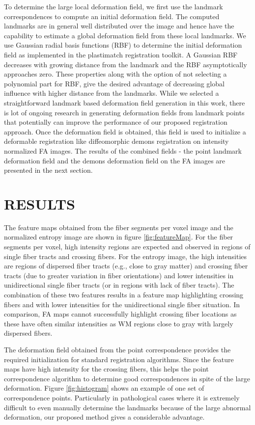\documentclass{llncs}
\begin{document}
To determine the large local deformation field, we first use the landmark correspondences to compute an initial deformation field. The computed landmarks are in general well distributed over the image and hence have the capability to estimate a global deformation field from these  local landmarks. We use  Gaussian radial basis functions (RBF) to determine the initial deformation field as implemented in the plastimatch registration toolkit. A Gaussian RBF decreases with growing distance from the landmark and the RBF asymptotically approaches zero. These properties along with the option of not selecting a polynomial part for RBF, give the desired advantage of decreasing global influence with higher distance from the landmarks. While we selected a straightforward landmark based deformation field generation in this work, there is lot of ongoing research in generating deformation fields from landmark points that potentially can improve the performance of our proposed registration approach. Once the deformation field is obtained, this field is used to initialize a deformable registration like diffeomorphic demons registration on intensity normalized FA images. The results of the combined fields - the point landmark deformation field and the demons deformation field on the FA images are presented in the next section.

\section{RESULTS}

The feature maps obtained from the fiber segments per voxel image and the normalized entropy image are shown in figure \ref{fig:featureMap}. For the fiber segments per voxel,  high intensity regions are expected and observed in regions of single fiber tracts and crossing fibers. For the entropy image, the high intensities are regions of dispersed fiber tracts (e.g., close to gray matter) and crossing fiber tracts (due to greater variation in fiber orientations) and lower intensities in unidirectional single fiber tracts (or in regions with lack of fiber tracts). The combination of  these two features results in a feature map highlighting crossing fibers and with lower intensities for the unidirectional single fiber situation. In comparison, FA maps cannot successfully highlight crossing fiber locations as these have often similar intensities as WM regions close to gray with largely dispersed fibers.

The deformation field obtained from the point correspondence provides the required initialization for standard registration algorithms. Since the feature maps have high intensity for the crossing fibers, this helps the point correspondence algorithm to determine good correspondences in spite of the large deformation. Figure \ref{fig:histogram} shows an example of one set of correspondence points. Particularly in pathological cases where it is extremely difficult to even manually determine the landmarks because of the large abnormal deformation, our proposed method gives a considerable advantage.
\end{document}
